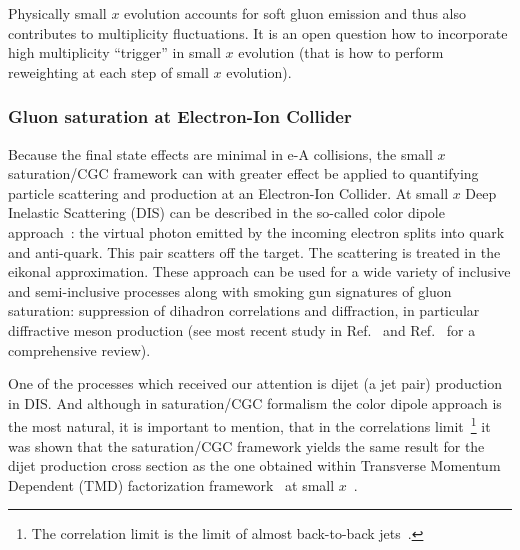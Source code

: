 Physically small $x$ evolution accounts for soft gluon emission and thus 
also contributes to multiplicity fluctuations. It is an open question how to 
incorporate high multiplicity ``trigger'' in small $x$ evolution (that is how to perform 
reweighting at each step of small $x$ evolution). 

%
%
%
%
%



\subsubsection*{Gluon saturation at Electron-Ion Collider} 
Because the final state effects are  minimal in e-A collisions, 
the small $x$ saturation/CGC framework can with greater effect be applied to 
quantifying particle scattering and production at an Electron-Ion Collider. 
At small $x$ Deep Inelastic Scattering (DIS) can be described in the so-called color 
dipole approach~\cite{Gunion:1976iy,Nussinov:1975mw,Nussinov:1975qb,Marquet:2009ca}: 
the virtual photon emitted by the incoming electron splits into quark and anti-quark.
This pair scatters off the target. The scattering is treated in the eikonal approximation.
These approach can be used for a wide variety of inclusive and semi-inclusive processes  
along with  smoking gun signatures of gluon saturation: suppression of dihadron 
correlations 
 and diffraction, in particular diffractive meson production 
(see most recent study in Ref.~\cite{Mantysaari:2017slo}
and Ref.~\cite{Aschenauer:2017jsk} 
for a comprehensive review). 



One of the processes which received our attention  is dijet (a jet pair) production in DIS.
And although in saturation/CGC formalism the color dipole approach is the most natural, 
it is important to mention, that in the correlations limit~\footnote{The correlation limit is  
the limit of almost back-to-back jets~\cite{Dominguez:2011wm,Dominguez:2011br}.}
it was shown that the saturation/CGC framework yields the same result for the dijet production
cross section as the one obtained within Transverse Momentum Dependent (TMD) factorization 
framework~\cite{Mulders:2000sh,Bomhof:2006dp,Meissner:2007rx} at small $x$~\cite{Metz:2011wb,Dominguez:2011wm}. 



